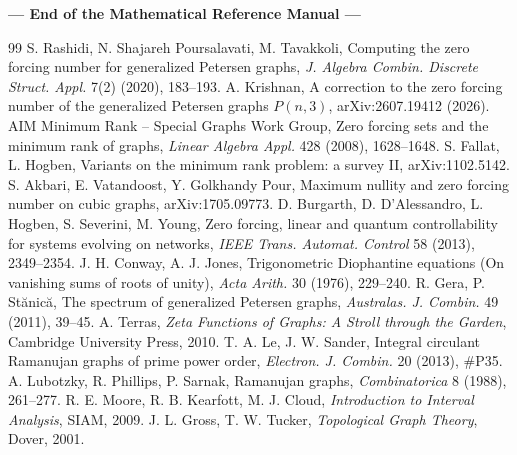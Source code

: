 \documentclass[11pt]{article}
\begin{document}
\vspace{0.6cm}
\begin{center}
\textbf{--- End of the Mathematical Reference Manual ---}
\end{center}

\begin{thebibliography}{99}
 S. Rashidi, N. Shajareh Poursalavati, M. Tavakkoli, Computing the zero forcing number for generalized Petersen graphs, \emph{J. Algebra Combin. Discrete Struct. Appl.} 7(2) (2020), 183--193.
 A. Krishnan, A correction to the zero forcing number of the generalized Petersen graphs $P(n,3)$, arXiv:2607.19412 (2026).
 AIM Minimum Rank -- Special Graphs Work Group, Zero forcing sets and the minimum rank of graphs, \emph{Linear Algebra Appl.} 428 (2008), 1628--1648.
 S. Fallat, L. Hogben, Variants on the minimum rank problem: a survey II, arXiv:1102.5142.
 S. Akbari, E. Vatandoost, Y. Golkhandy Pour, Maximum nullity and zero forcing number on cubic graphs, arXiv:1705.09773.
 D. Burgarth, D. D'Alessandro, L. Hogben, S. Severini, M. Young, Zero forcing, linear and quantum controllability for systems evolving on networks, \emph{IEEE Trans. Automat. Control} 58 (2013), 2349--2354.
 J. H. Conway, A. J. Jones, Trigonometric Diophantine equations (On vanishing sums of roots of unity), \emph{Acta Arith.} 30 (1976), 229--240.
 R. Gera, P. St\u{a}nic\u{a}, The spectrum of generalized Petersen graphs, \emph{Australas. J. Combin.} 49 (2011), 39--45.
 A. Terras, \emph{Zeta Functions of Graphs: A Stroll through the Garden}, Cambridge University Press, 2010.
 T. A. Le, J. W. Sander, Integral circulant Ramanujan graphs of prime power order, \emph{Electron. J. Combin.} 20 (2013), \#P35.
 A. Lubotzky, R. Phillips, P. Sarnak, Ramanujan graphs, \emph{Combinatorica} 8 (1988), 261--277.
 R. E. Moore, R. B. Kearfott, M. J. Cloud, \emph{Introduction to Interval Analysis}, SIAM, 2009.
 J. L. Gross, T. W. Tucker, \emph{Topological Graph Theory}, Dover, 2001.
\end{thebibliography}
\end{document}
